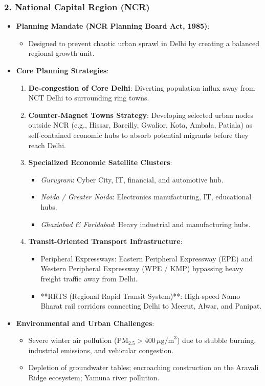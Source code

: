 \documentclass[11pt,a4paper]{article}
\begin{document}
\subsubsection{2. National Capital Region (NCR)}
\begin{itemize}[leftmargin=*]
  \item \textbf{Planning Mandate (NCR Planning Board Act, 1985)}:
  \begin{itemize}
    \item Designed to prevent chaotic urban sprawl in Delhi by creating a balanced regional growth unit.
  \end{itemize}

  \item \textbf{Core Planning Strategies}:
  \begin{enumerate}
    \item \textbf{De-congestion of Core Delhi}: Diverting population influx away from NCT Delhi to surrounding ring towns.
    \item \textbf{Counter-Magnet Towns Strategy}: Developing selected urban nodes outside NCR (e.g., Hissar, Bareilly, Gwalior, Kota, Ambala, Patiala) as self-contained economic hubs to absorb potential migrants before they reach Delhi.
    \item \textbf{Specialized Economic Satellite Clusters}:
    \begin{itemize}
      \item \textit{Gurugram}: Cyber City, IT, financial, and automotive hub.
      \item \textit{Noida / Greater Noida}: Electronics manufacturing, IT, educational hubs.
      \item \textit{Ghaziabad \& Faridabad}: Heavy industrial and manufacturing hubs.
    \end{itemize}
    \item \textbf{Transit-Oriented Transport Infrastructure}:
    \begin{itemize}
      \item Peripheral Expressways: Eastern Peripheral Expressway (EPE) and Western Peripheral Expressway (WPE / KMP) bypassing heavy freight traffic away from Delhi.
      \item **RRTS (Regional Rapid Transit System)**: High-speed Namo Bharat rail corridors connecting Delhi to Meerut, Alwar, and Panipat.
    \end{itemize}
  \end{enumerate}

  \item \textbf{Environmental and Urban Challenges}:
  \begin{itemize}
    \item Severe winter air pollution ($\text{PM}_{2.5} > 400\,\mu\text{g/m}^3$) due to stubble burning, industrial emissions, and vehicular congestion.
    \item Depletion of groundwater tables; encroaching construction on the Aravali Ridge ecosystem; Yamuna river pollution.
  \end{itemize}
\end{itemize}
\end{document}
